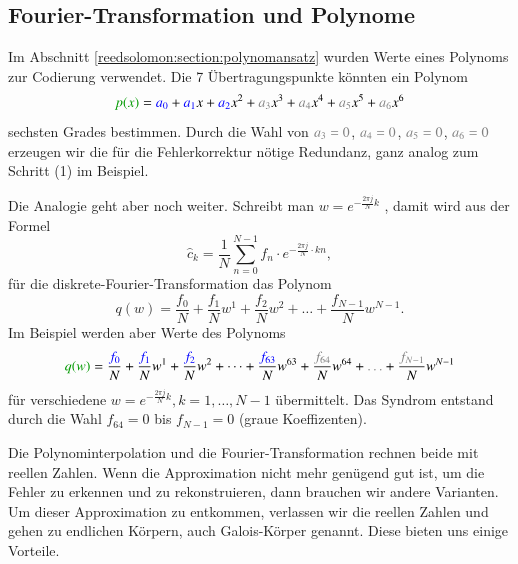 \subsection{Fourier-Transformation und Polynome\label{reedsolomon:subsection:ftandpolynom}}
Im Abschnitt \ref{reedsolomon:section:polynomansatz}
wurden Werte eines Polynoms zur Codierung verwendet.
Die 7 Übertragungspunkte könnten ein Polynom
\begin{equation}
	\textcolor{darkgreen}{p(x)}
	=
	\textcolor{blue}{a_0} + \textcolor{blue}{a_1}x + \textcolor{blue}{a_2}x^2 +
	\textcolor{gray}{a_3}x^3 + \textcolor{gray}{a_4}x^4 + \textcolor{gray}{a_5}x^5 +
	\textcolor{gray}{a_6}x^6
\label{reedsolomon:equationpoly}
\end{equation}
sechsten Grades bestimmen.
Durch die Wahl von $\textcolor{gray}{a_3=0}$, $\textcolor{gray}{a_4=0}$, $\textcolor{gray}{a_5=0}$, $\textcolor{gray}{a_6=0}$ 
erzeugen wir die für die Fehlerkorrektur nötige Redundanz, ganz analog zum Schritt (1) im Beispiel.
\par 
Die Analogie geht aber noch weiter.
 Schreibt man 
 \( w =
 e^{-\frac{2\pi j}{N} k}\)
 \label{reedsolomon:DFT_summand}, damit wird aus der Formel
 \begin{equation}
	\hat{c}_{k} 
	= \frac{1}{N} \sum_{n=0}^{N-1}
	{f}_n \cdot e^{-\frac{2\pi j}{N} \cdot kn}
	,\label{reedsolomon:DFT}
 \end{equation}
 für die diskrete-Fourier-Transformation das Polynom
 \begin{equation}
	q(w)=
	\frac{{f}_0}{N} + \frac{{f}_1}{N} w^1 + \frac{{f}_2}{N} w^2 + \dots + \frac{{f}_{N-1}}{N} w^{N-1}.
	\label{reedsolomon:DFT_polynom}
 \end{equation}
 Im Beispiel werden aber Werte des Polynoms
 \begin{equation}
	\textcolor{darkgreen}{q(w)}=
	\frac{\textcolor{blue}{{f}_0}}{N} + \frac{\textcolor{blue}{{f}_1}}{N} w^1 + \frac{\textcolor{blue}{{f}_2}}{N} w^2 + \dots + 
	\frac{\textcolor{blue}{{f}_{63}}}{N} w^{63} + \frac{\textcolor{gray}{{f}_{64}}}{N} w^{64} + \textcolor{gray}{\dots} + \frac{\textcolor{gray}{{f}_{N-1}}}{N} w^{N-1}
	\label{reedsolomon:DFT_polynom2}
 \end{equation}
	für verschiedene \( w = e^{-\frac{2\pi j}{N} k}, k=1, \dots ,N-1\) übermittelt.
Das Syndrom entstand durch die Wahl ${f_{64}}=0$ bis ${f}_{N-1}=0$ (graue Koeffizenten).

Die Polynominterpolation und die Fourier-Transformation rechnen beide mit reellen Zahlen.
Wenn die Approximation nicht mehr genügend gut ist, um die Fehler zu erkennen und zu rekonstruieren,
dann brauchen wir andere Varianten.
Um dieser Approximation zu entkommen, verlassen wir die reellen Zahlen und gehen zu endlichen Körpern, auch Galois-Körper genannt.
%
%
%
Diese bieten uns einige Vorteile.
